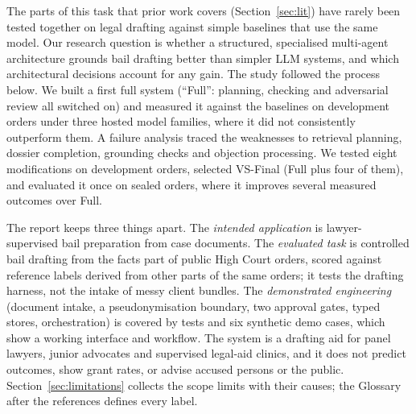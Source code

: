 \documentclass[11pt]{article}
\newcommand{\vs}{VS-Final}
\begin{document}
The parts of this task that prior work covers (Section~\ref{sec:lit}) have rarely been tested together on legal drafting against simple baselines that use the same model. Our research question is whether a structured, specialised multi-agent architecture grounds bail drafting better than simpler LLM systems, and which architectural decisions account for any gain. The study followed the process below. We built a first full system (``Full'': planning, checking and adversarial review all switched on) and measured it against the baselines on development orders under three hosted model families, where it did not consistently outperform them. A failure analysis traced the weaknesses to retrieval planning, dossier completion, grounding checks and objection processing. We tested eight modifications on development orders, selected \vs{} (Full plus four of them), and evaluated it once on sealed orders, where it improves several measured outcomes over Full.

The report keeps three things apart. The \emph{intended application} is lawyer-supervised bail preparation from case documents. The \emph{evaluated task} is controlled bail drafting from the facts part of public High Court orders, scored against reference labels derived from other parts of the same orders; it tests the drafting harness, not the intake of messy client bundles. The \emph{demonstrated engineering} (document intake, a pseudonymisation boundary, two approval gates, typed stores, orchestration) is covered by tests and six synthetic demo cases, which show a working interface and workflow. The system is a drafting aid for panel lawyers, junior advocates and supervised legal-aid clinics, and it does not predict outcomes, show grant rates, or advise accused persons or the public. Section~\ref{sec:limitations} collects the scope limits with their causes; the Glossary after the references defines every label.
\end{document}
